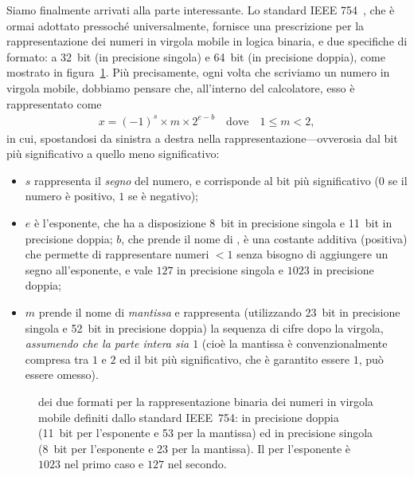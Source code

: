 Siamo finalmente arrivati alla parte interessante. Lo standard IEEE 754~\cite{ieee_754},
che è ormai adottato pressoché universalmente, fornisce una prescrizione
per la rappresentazione dei numeri in virgola mobile in logica binaria, e
due specifiche di formato: a 32~bit (in precisione singola) e 64~bit (in
precisione doppia), come mostrato in figura~\ref{fig:rappresentazione_float}.
Più precisamente, ogni volta che scriviamo un numero in virgola mobile, dobbiamo
pensare che, all'interno del calcolatore, esso è rappresentato come
\begin{align}\label{eq:ieee_754}
  x = (-1)^s \times m \times 2^{e - b} \quad \text{dove} \quad 1 \leq m < 2,
\end{align}
in cui, spostandosi da sinistra a destra nella rappresentazione---ovverosia dal
bit più significativo a quello meno significativo:
\begin{itemize}
  \item $s$ rappresenta il \emph{segno} del numero, e corrisponde al bit
    più significativo ($0$ se il numero è positivo, $1$ se è negativo);
  \item $e$ è l'esponente, che ha a disposizione 8~bit in precisione singola
    e 11~bit in precisione doppia; $b$, che prende il nome di ,
    è una costante additiva (positiva) che permette di rappresentare numeri
    $< 1$ senza bisogno di aggiungere un segno all'esponente, e vale $127$ in
    precisione singola e $1023$ in precisione doppia;
  \item $m$ prende il nome di \emph{mantissa} e rappresenta (utilizzando 23~bit in
    precisione singola e 52~bit in precisione doppia) la sequenza di cifre dopo
    la virgola, \emph{assumendo che la parte intera sia $1$} (cioè la mantissa
    è convenzionalmente compresa tra $1$ e $2$ ed il bit più significativo,
    che è garantito essere $1$, può essere omesso).
\end{itemize}

\begin{figure}[!htbp]
  \center
  \vspace*{-10pt}
  \caption{ dei due formati per la rappresentazione binaria dei
  numeri in virgola mobile definiti dallo standard IEEE~754: in precisione
  doppia (11~bit per l'esponente e 53 per la mantissa) ed in precisione singola
  (8~bit per l'esponente e 23 per la mantissa). Il  per l'esponente
  è $1023$ nel primo caso e $127$ nel secondo.}
  \label{fig:rappresentazione_float}
\end{figure}


